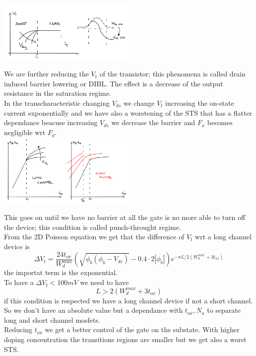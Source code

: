 \centering
\includegraphics[width=0.5\textwidth]{dibl.png}\\
\raggedright

We are further reducing the $V_t$ of the transistor; this phenomena is called drain induced barrier lowering or DIBL. The effect is a decrease of the output resistance in the saturation regime.\\
In the transcharacteristic changing $V_{ds}$ we change $V_t$ increasing the on-state current exponentially and we have also a worstening of the STS that has a flatter dependance beacuse increasing $V_{ds}$ we decrease the barrier and $F_x$ becomes negligible wrt $F_y$.\\

\centering
\includegraphics[width=0.5\textwidth]{shorttc.png}\\
\raggedright

This goes on until we have no barrier at all the gate is no more able to turn off the device; this condition is called punch-throught regime.\\
\vspace{5mm}
From the 2D Poisson equation we get that the difference of $V_t$ wrt a long channel device is 
\begin{equation}
\Delta V_t= \frac{24t_{ox}}{W_d^{max}}\left(\sqrt{\phi_b(\phi_b-V_{ds})}-0.4\cdot 2|\phi_b|\right)e^{-\pi L/2(W_d^{max}+3t_{ox})}
\end{equation} 
the importat term is the exponential.\\
To have a $\Delta V_t<100mV$ we need to have 
\begin{equation}
L>2(W_d^{max}+3t_{ox})
\end{equation}
if this condition is respected we have a long channel device if not a short channel. So we don't have an absolute value but a dependance with $t_{ox},N_a$ to separate long and short channel mosfets.\\
Reducing $t_{ox}$ we get a better control of the gate on the substate. With higher doping concentration the transitions regions are smaller but we get also a worst STS.\\

